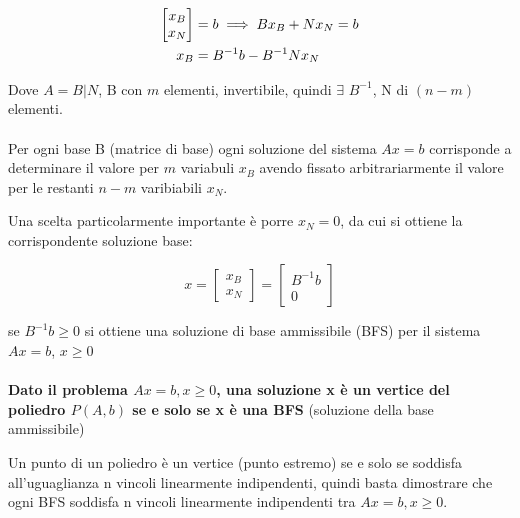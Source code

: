 \documentclass[a4paper, 11pt]{article}
\begin{document}
            \begin{align}
                [B|N] 
                \begin{bmatrix}
                    x_B \\
                    x_N 
                \end{bmatrix} &= b
                \implies B x_B + N x_N = b \notag \\
                x_B &= B^{-1} b -B^{-1} N x_N \notag 
            \end{align}

            Dove $A = B|N$, B con $m$ elementi, invertibile, quindi $\exists$ $B^{-1}$, N di $(n-m)$ elementi.
            

            \paragraph{}
            Per ogni base B (matrice di base) ogni soluzione del sistema $Ax = b$ corrisponde a determinare il valore per $m$ variabuli $x_B$ avendo fissato arbitrariarmente il valore per le restanti $n-m$ varibiabili $x_N$.

            Una scelta particolarmente importante è porre $x_N = 0$, da cui si ottiene la corrispondente soluzione base: 
            
            \[ 
                x = 
                \begin{bmatrix}
                    x_B \\
                    x_N
                \end{bmatrix}
                = 
                \begin{bmatrix}
                    B^{-1}b \\
                    0
                \end{bmatrix}
            \]



            se $B^{-1} b \geq 0$ si ottiene una soluzione di base ammissibile (BFS) per il sistema $Ax = b$, $x \geq 0$


            \paragraph{}
            \textbf{Dato il problema $Ax = b,x \geq 0$, una soluzione x è un vertice del
            poliedro $P(A, b)$ se e solo se x è una BFS} (soluzione della base ammissibile)

            Un punto di un poliedro è un vertice (punto estremo) se e solo se soddisfa all’uguaglianza n vincoli linearmente indipendenti, quindi basta dimostrare che ogni BFS soddisfa n vincoli linearmente indipendenti tra $Ax = b,x \geq 0$.
\end{document}
